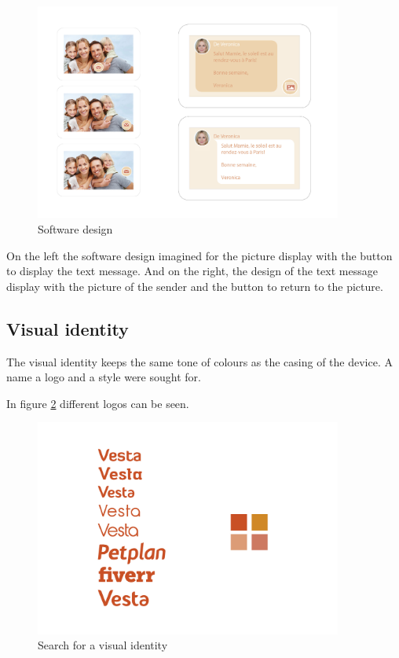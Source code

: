 \begin{figure}[!htb]
    \centering
    \includegraphics[width=0.9\textwidth,keepaspectratio]{chap/designFig/vesta_design.jpg}
    \caption{Software design}
    \label{fig:soft design}
\end{figure}

On the left the software design imagined for the picture display with the button to display the text message. And on the right, the design of the text message display with the picture of the sender and the button to return to the picture.
\subsection{Visual identity}
The visual identity keeps the same tone of colours as the casing of the device. A name a logo and a style were sought for.

In figure \ref{fig:id seek} different logos can be seen.
\begin{figure}[!htb]
    \centering
    \includegraphics[width=0.9\textwidth,keepaspectratio]{chap/designFig/VestaRechercheIdentity3}
    \caption{Search for a visual identity}
    \label{fig:id seek}
\end{figure}


